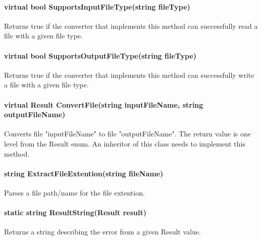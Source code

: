         \paragraph{virtual bool SupportsInputFileType(string fileType)}  
        \hfill \break
        Returns true if the converter that implements this method can successfully read a file with a given file type.

        \paragraph{virtual bool SupportsOutputFileType(string fileType)}
        \hfill \break
        Returns true if the converter that implements this method can successfully write a file with a given file type.

        \paragraph{virtual Result ConvertFile(string inputFileName, string outputFileName)}
        \hfill \break
        Converts file "inputFileName" to file "outputFileName".  The return value is one level from the Result enum.  An inheritor of this class needs to implement this method.

        \paragraph{string ExtractFileExtention(string fileName)}
        \hfill \break
        Parses a file path/name for the file extention.

        \paragraph{static string ResultString(Result result)}
        \hfill \break
        Returns a string describing the error from a given Result value.
